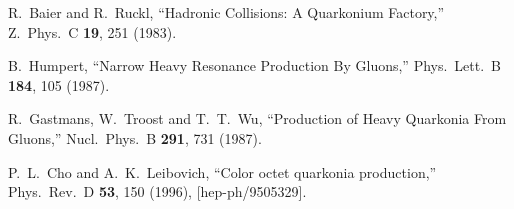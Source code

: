 \documentclass[aps,prc,preprint,superscriptaddress,showpacs,showkeys,amsmath]{revtex4-1}
\begin{document}
\begin{thebibliography}{100}




  








%
  R.~Baier and R.~Ruckl,
  ``Hadronic Collisions: A Quarkonium Factory,''
  Z.\ Phys.\ C {\bf 19}, 251 (1983).


  B.~Humpert,
  ``Narrow Heavy Resonance Production By Gluons,''
  Phys.\ Lett.\ B {\bf 184}, 105 (1987).



  R.~Gastmans, W.~Troost and T.~T.~Wu,
  ``Production of Heavy Quarkonia From Gluons,''
  Nucl.\ Phys.\ B {\bf 291}, 731 (1987).



  P.~L.~Cho and A.~K.~Leibovich,
  ``Color octet quarkonia production,''
  Phys.\ Rev.\ D {\bf 53}, 150 (1996),
  [hep-ph/9505329].


\end{thebibliography}
\end{document}
